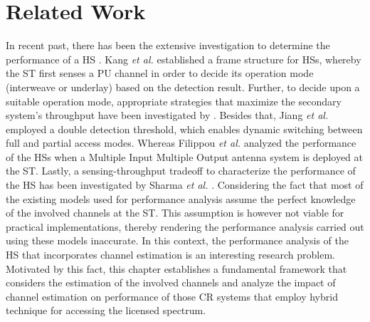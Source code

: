 \section{Related Work}


In recent past, there has been the extensive investigation to determine the performance of a HS \cite{Kang09, Oh10, Senthu12, Song13, Gmira15, Jiang13, Fili15, Sharma14}. Kang \textit{et al.} \cite{Kang09} established a frame structure for HSs, whereby the ST first senses a PU channel in order to decide its operation mode (interweave or underlay) based on the detection result. Further, to decide upon a suitable operation mode, appropriate strategies that maximize the secondary system's throughput have been investigated by \cite{Oh10, Senthu12, Song13, Gmira15}. Besides that, Jiang \textit{et al.} employed a double detection threshold, which enables dynamic switching between full and partial access modes. Whereas Filippou \textit{et al.} \cite{Fili15} analyzed the performance of the HSs when a Multiple Input Multiple Output antenna system is deployed at the ST. Lastly, a sensing-throughput tradeoff to characterize the performance of the HS has been investigated by Sharma \textit{et al.} \cite{Sharma14}. 
Considering the fact that most of the existing models \cite{Kang09, Oh10, Senthu12, Song13, Gmira15, Jiang13, Fili15, Sharma14} used for performance analysis assume the perfect knowledge of the involved channels at the ST. This assumption is however not viable for practical implementations, thereby rendering the performance analysis carried out using these models inaccurate. In this context, the performance analysis of the HS that incorporates channel estimation is an interesting research problem. Motivated by this fact, this chapter establishes a fundamental framework that considers the estimation of the involved channels and analyze the impact of channel estimation on performance of those CR systems that employ hybrid technique for accessing the licensed spectrum.
